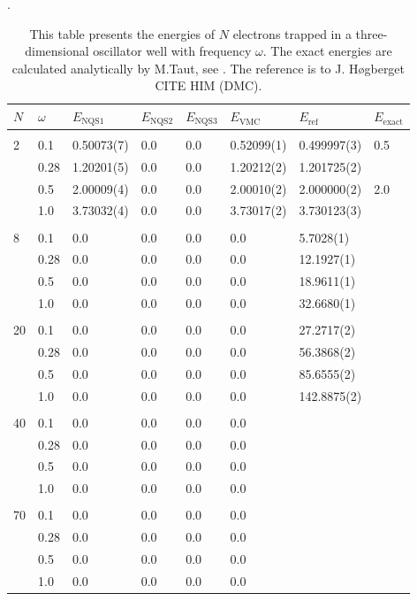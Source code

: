 \begin{table} [H]
	\caption{This table presents the energies of $N$ electrons trapped in a three-dimensional oscillator well with frequency $\omega$. The exact energies are calculated analytically by M.Taut, see \cite{taut_two_1993}. The reference is to J. Høgberget CITE HIM (DMC). }. 
	\begin{tabularx}{\textwidth}{l:l|XXXXXX} \hline\hline
		\label{tab:quantumdotswinteraction3D}
		$N$ & $\omega$ & $E_{\text{NQS1}}$ & $E_{\text{NQS2}}$ & $E_{\text{NQS3}}$ & $E_{\text{VMC}}$ & $E_{\text{ref}} $ & $E_{\text{exact}}$ \\ \hline \\
		2 & 0.1 & 0.50073(7) & 0.0 & 0.0 & 0.52099(1) & 0.499997(3) & 0.5 \\
		& 0.28 & 1.20201(5) & 0.0 & 0.0 & 1.20212(2) & 1.201725(2) & \\
		& 0.5 & 2.00009(4) & 0.0 & 0.0 & 2.00010(2) & 2.000000(2) & 2.0 \\
		& 1.0 & 3.73032(4) & 0.0 & 0.0 & 3.73017(2) & 3.730123(3) &  \\ \hdashline \\
		
		8 & 0.1 & 0.0 & 0.0 & 0.0 & 0.0 & 5.7028(1) \\ 
		& 0.28 & 0.0 & 0.0 & 0.0 & 0.0 & 12.1927(1) \\
		& 0.5 & 0.0 & 0.0 & 0.0 & 0.0 & 18.9611(1) \\
		& 1.0 & 0.0 & 0.0 & 0.0 & 0.0 & 32.6680(1) \\ \hdashline \\
		
		20 & 0.1 & 0.0 & 0.0 & 0.0 & 0.0 & 27.2717(2) \\ 
		& 0.28 & 0.0 & 0.0 & 0.0 & 0.0 & 56.3868(2) \\
		& 0.5 & 0.0 & 0.0 & 0.0 & 0.0 & 85.6555(2) \\
		& 1.0 & 0.0 & 0.0 & 0.0 & 0.0 & 142.8875(2) \\ \hdashline \\
		
		40 & 0.1 & 0.0 & 0.0 & 0.0 & 0.0 \\ 
		& 0.28 & 0.0 & 0.0 & 0.0 & 0.0 \\
		& 0.5 & 0.0 & 0.0 & 0.0 & 0.0 \\
		& 1.0 & 0.0 & 0.0 & 0.0 & 0.0 \\ \hdashline \\
		
		70 & 0.1 & 0.0 & 0.0 & 0.0 & 0.0 \\ 
		& 0.28 & 0.0 & 0.0 & 0.0 & 0.0 \\
		& 0.5 & 0.0 & 0.0 & 0.0 & 0.0 \\
		& 1.0 & 0.0 & 0.0 & 0.0 & 0.0 \\ \hline\hline
	\end{tabularx}
\end{table}

